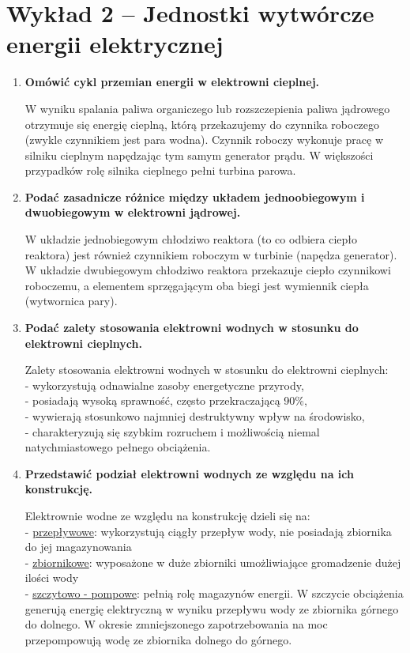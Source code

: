 \documentclass[12pt]{article}
\newcommand{\pytanie}[1]{\item \textbf{#1}}
\begin{document}
\section{Wykład 2 -- Jednostki wytwórcze energii elektrycznej}
\begin{enumerate}
    \pytanie{Omówić cykl przemian energii w elektrowni cieplnej.}

        W wyniku spalania paliwa organiczego lub rozszczepienia paliwa jądrowego otrzymuje się energię cieplną,
        którą przekazujemy do czynnika roboczego (zwykle czynnikiem jest para wodna). Czynnik roboczy wykonuje pracę 
        w silniku cieplnym napędzając tym samym generator prądu. W większości przypadków rolę silnika cieplnego pełni turbina parowa.

    \pytanie{Podać zasadnicze różnice między układem jednoobiegowym i dwuobiegowym w elektrowni jądrowej.}
    
        W układzie jednobiegowym chłodziwo reaktora (to co odbiera ciepło reaktora) jest również czynnikiem roboczym
        w turbinie (napędza generator).\\
        W układzie dwubiegowym chłodziwo reaktora przekazuje ciepło czynnikowi roboczemu, a elementem sprzęgającym
        oba biegi jest wymiennik ciepła (wytwornica pary).

    \pytanie{Podać zalety stosowania elektrowni wodnych w stosunku do elektrowni cieplnych.}

        Zalety stosowania elektrowni wodnych w stosunku do elektrowni cieplnych:\\
        - wykorzystują odnawialne zasoby energetyczne przyrody,\\
        - posiadają wysoką sprawność, często przekraczającą 90\%,\\
        - wywierają stosunkowo najmniej destruktywny wpływ na środowisko,\\
        - charakteryzują się szybkim rozruchem i możliwością niemal natychmiastowego pełnego obciążenia.
    
    \pytanie{Przedstawić podział elektrowni wodnych ze względu na ich konstrukcję.}
    
        Elektrownie wodne ze względu na konstrukcję dzieli się na:\\
        - \underline{przepływowe}: wykorzystują ciągły przepływ wody, nie posiadają zbiornika do jej magazynowania\\
        - \underline{zbiornikowe}: wyposażone w duże zbiorniki umożliwiające gromadzenie dużej ilości wody\\
        - \underline{szczytowo - pompowe}: pełnią rolę magazynów energii. W szczycie obciążenia generują energię elektryczną w wyniku
        przepływu wody ze zbiornika górnego do dolnego. W okresie zmniejszonego zapotrzebowania na moc przepompowują
        wodę ze zbiornika dolnego do górnego.


\end{enumerate}
\end{document}
